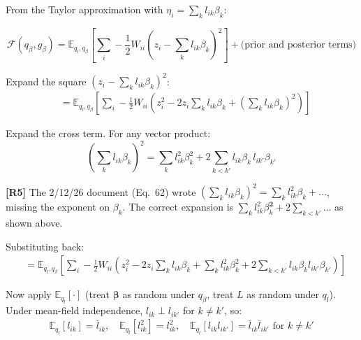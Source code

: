 \documentclass[11pt]{article}
\newcommand{\lbar}[2]{\bar{l}_{#1#2}}
\newcommand{\lsec}[2]{\overline{l^2_{#1#2}}}
\begin{document}
From the Taylor approximation with $\eta_i = \sum_k l_{ik}\beta_k$:

\begin{equation}
  \mathcal{F}(q_\beta, g_\beta)
  = \mathbb{E}_{q_l, q_\beta}\!\left[
    \sum_i -\frac{1}{2}W_{ii}\left(z_i - \sum_k l_{ik}\beta_k\right)^2
  \right] + \text{(prior and posterior terms)}
\end{equation}

\begin{derivbox}
Expand the square $\left(z_i - \sum_k l_{ik}\beta_k\right)^2$:
\begin{align}
  &= \mathbb{E}_{q_l, q_\beta}\!\left[\sum_i -\frac{1}{2}W_{ii}
     \left(z_i^2 - 2z_i\sum_k l_{ik}\beta_k
           + \left(\sum_k l_{ik}\beta_k\right)^2
     \right)
  \right] \label{eq:Fqb-expand1}
\end{align}

Expand the cross term. For any vector product:
\begin{equation}
  \left(\sum_k l_{ik}\beta_k\right)^2
  = \sum_k l_{ik}^2\beta_k^2 + 2\sum_{k < k'} l_{ik}\beta_k\,l_{ik'}\beta_{k'}
  \label{eq:cross-expand}
\end{equation}

\begin{correctionbox}
\textbf{[R5]} The 2/12/26 document (Eq.\ 62) wrote
$(\sum_k l_{ik}\beta_k)^2 = \sum_k l_{ik}^2\beta_k + \ldots$,
missing the exponent on $\beta_k$.  The correct expansion is
$\sum_k l_{ik}^2\beta_k^{\mathbf{2}} + 2\sum_{k<k'}\ldots$ as shown above.
\end{correctionbox}

Substituting back:
\begin{align}
  &= \mathbb{E}_{q_l, q_\beta}\!\left[\sum_i -\frac{1}{2}W_{ii}
     \left(z_i^2 - 2z_i\sum_k l_{ik}\beta_k
           + \sum_k l_{ik}^2\beta_k^2
           + 2\sum_{k<k'} l_{ik}\beta_k l_{ik'}\beta_{k'}
     \right)
  \right] \label{eq:Fqb-expand2}
\end{align}

Now apply $\mathbb{E}_{q_l}[\cdot]$ (treat $\bm{\beta}$ as random under $q_\beta$,
treat $L$ as random under $q_l$).  Under mean-field independence,
$l_{ik} \perp l_{ik'}$ for $k \neq k'$, so:
\begin{equation}
  \mathbb{E}_{q_l}[l_{ik}] = \lbar{i}{k},\quad
  \mathbb{E}_{q_l}[l_{ik}^2] = \lsec{i}{k},\quad
  \mathbb{E}_{q_l}[l_{ik}l_{ik'}] = \lbar{i}{k}\lbar{i}{k'} \text{ for } k\neq k'
\end{equation}


\end{derivbox}
\end{document}
